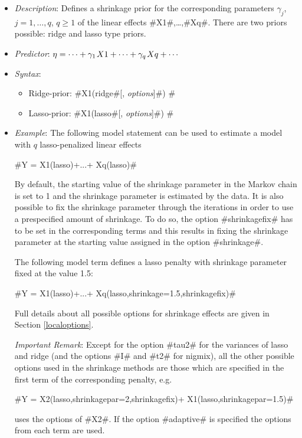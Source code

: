 \begin{itemize}
\item[] {\em Description}: Defines a shrinkage prior for the corresponding
  parameters $\gamma _{j} $, $j=1,\ldots,q$, $q \ge 1$ of the linear effects
  #X1#,\ldots,#Xq#. There are two priors possible: ridge and
  lasso type priors.

\item[] {\em Predictor}: $\eta =\cdots +\gamma _{1} {\kern 1pt} X1+\cdots +
  \gamma _{q} {\kern 1pt} Xq+\cdots $

\item[] {\em Syntax}:

  \begin{itemize}
  \item  Ridge-prior: #X1(ridge#[, {\em options}]#) #
  \item  Lasso-prior: #X1(lasso#[, {\em options}]#) #
  \end{itemize}

\item[] {\em Example}:
 The following model statement can be used to estimate a model with $q$ lasso-penalized
 linear effects

 #Y = X1(lasso)+...+ Xq(lasso)#

 By default, the starting value of the shrinkage parameter in the Markov chain is
 set to 1 and the shrinkage parameter is estimated by the data. It is also possible
 to fix the shrinkage parameter through the iterations in order to use a prespecified
 amount of shrinkage. To do so, the option #shrinkagefix# has to be set
 in the corresponding terms and this results in fixing the shrinkage parameter at
 the starting value assigned in the option #shrinkage#.

 The following model term defines a lasso penalty with shrinkage parameter
 fixed at the value 1.5:

 #Y = X1(lasso)+...+ Xq(lasso,shrinkage=1.5,shrinkagefix)#

 Full details about all possible options for shrinkage effects are given in Section \ref{localoptions}.

 {\em Important Remark}: Except for the option #tau2# for the variances of lasso and ridge
 (and the options #I# and #t2# for nigmix),
 all the other possible options used in the shrinkage methods are those which are
 specified in the first term of the corresponding penalty, e.g.

 #Y = X2(lasso,shrinkagepar=2,shrinkagefix)+ X1(lasso,shrinkagepar=1.5)#

 uses the options of #X2#. If the option #adaptive# is specified the options from
 each term are used.
\end{itemize}

